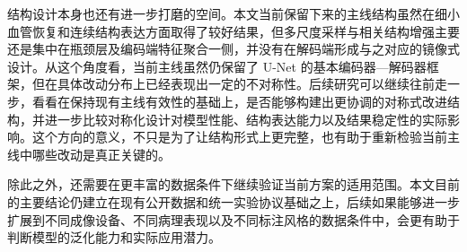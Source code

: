 \documentclass[a4paper,12pt]{article}
\begin{document}
结构设计本身也还有进一步打磨的空间。本文当前保留下来的主线结构虽然在细小血管恢复和连续结构表达方面取得了较好结果，但多尺度采样与相关结构增强主要还是集中在瓶颈层及编码端特征聚合一侧，并没有在解码端形成与之对应的镜像式设计。从这个角度看，当前主线虽然仍保留了 U-Net 的基本编码器—解码器框架，但在具体改动分布上已经表现出一定的不对称性。后续研究可以继续往前走一步，看看在保持现有主线有效性的基础上，是否能够构建出更协调的对称式改进结构，并进一步比较对称化设计对模型性能、结构表达能力以及结果稳定性的实际影响。这个方向的意义，不只是为了让结构形式上更完整，也有助于重新检验当前主线中哪些改动是真正关键的。

除此之外，还需要在更丰富的数据条件下继续验证当前方案的适用范围。本文目前的主要结论仍建立在现有公开数据和统一实验协议基础之上，后续如果能够进一步扩展到不同成像设备、不同病理表现以及不同标注风格的数据条件中，会更有助于判断模型的泛化能力和实际应用潜力。

\clearpage


\end{document}
